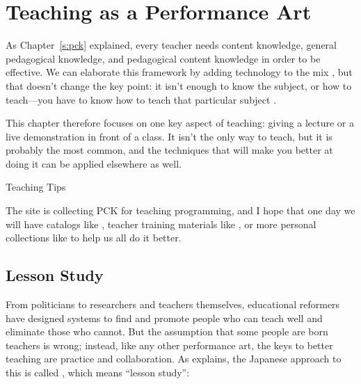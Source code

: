 \chapter{Teaching as a Performance Art}\label{s:performance}

As Chapter~\ref{s:pck} explained, every teacher needs content knowledge,
general pedagogical knowledge, and pedagogical content knowledge in
order to be effective. We can elaborate this framework by adding
technology to the mix \cite{Koeh2013}, but that doesn't change the
key point: it isn't enough to know the subject, or how to teach---you have
to know how to teach that particular subject \cite{Maye2004}.

This chapter therefore focuses on one key aspect of teaching: giving a
lecture or a live demonstration in front of a class. It isn't the only
way to teach, but it is probably the most common, and the techniques
that will make you better at doing it can be applied elsewhere as well.

\begin{aside}{Teaching Tips}

The  site is collecting PCK for
teaching programming, and I hope that one day we will have catalogs
like \cite{Ojos2015}, teacher training materials like
\cite{Hazz2014,Guzd2015a,Sent2018}, or more
personal collections like \cite{Gelm2002} to help us all do it
better.

\end{aside}

\section{Lesson Study}\label{s:performance-jugyokenkyu}

From politicians to researchers and teachers themselves, educational
reformers have designed systems to find and promote people who can teach
well and eliminate those who cannot. But the assumption that some people
are born teachers is wrong; instead, like any other performance art, the
keys to better teaching are practice and collaboration. As
\cite{Gree2014} explains, the Japanese approach to this is called
, which means ``lesson study'':

